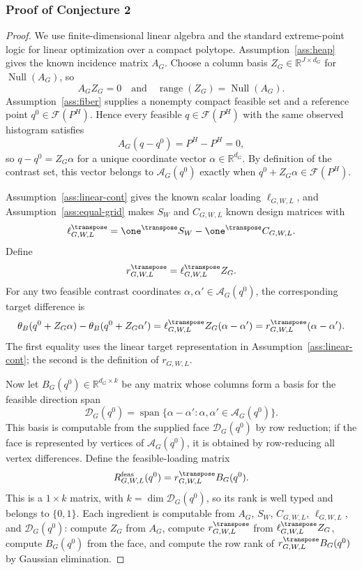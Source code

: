 \subsubsection*{Proof of Conjecture 2}
\begin{proof}
We use finite-dimensional linear algebra and the standard extreme-point logic for linear optimization over a compact polytope.  Assumption~\ref{ass:heap} gives the known incidence matrix \(A_G\).  Choose a column basis \(Z_G\in\mathbb{R}^{J\times d_G}\) for \(\operatorname{Null}(A_G)\), so
\[
A_GZ_G=0
\quad\text{and}\quad
\operatorname{range}(Z_G)=\operatorname{Null}(A_G).
\]
Assumption~\ref{ass:fiber} supplies a nonempty compact feasible set and a reference point \(q^0\in\mathcal{F}(P^H)\).  Hence every feasible \(q\in\mathcal{F}(P^H)\) with the same observed histogram satisfies
\[
A_G(q-q^0)=P^H-P^H=0,
\]
so \(q-q^0=Z_G\alpha\) for a unique coordinate vector \(\alpha\in\mathbb{R}^{d_G}\).  By definition of the contrast set, this vector belongs to \(\mathcal{A}_G(q^0)\) exactly when \(q^0+Z_G\alpha\in\mathcal{F}(P^H)\).

Assumption~\ref{ass:linear-cont} gives the known scalar loading \(\ell_{G,W,L}\), and Assumption~\ref{ass:equal-grid} makes \(S_W\) and \(C_{G,W,L}\) known design matrices with
\[
\ell_{G,W,L}^{\transpose}=\one^{\transpose}S_W-\one^{\transpose}C_{G,W,L}.
\]
Define
\[
r_{G,W,L}^{\transpose}=\ell_{G,W,L}^{\transpose}Z_G .
\]
For any two feasible contrast coordinates \(\alpha,\alpha'\in\mathcal{A}_G(q^0)\), the corresponding target difference is
\[
\theta_B(q^0+Z_G\alpha)-\theta_B(q^0+Z_G\alpha')
=\ell_{G,W,L}^{\transpose}Z_G(\alpha-\alpha')
=r_{G,W,L}^{\transpose}(\alpha-\alpha').
\]
The first equality uses the linear target representation in Assumption~\ref{ass:linear-cont}; the second is the definition of \(r_{G,W,L}\).

Now let \(B_G(q^0)\in\mathbb{R}^{d_G\times k}\) be any matrix whose columns form a basis for the feasible direction span
\[
\mathcal{D}_G(q^0)=\operatorname{span}\{\alpha-\alpha':\alpha,\alpha'\in\mathcal{A}_G(q^0)\}.
\]
This basis is computable from the supplied face \(\mathcal{D}_G(q^0)\) by row reduction; if the face is represented by vertices of \(\mathcal{A}_G(q^0)\), it is obtained by row-reducing all vertex differences.  Define the feasible-loading matrix
\[
R^{\mathrm{feas}}_{G,W,L}(q^0)=r_{G,W,L}^{\transpose}B_G(q^0).
\]
This is a \(1\times k\) matrix, with \(k=\dim\mathcal{D}_G(q^0)\), so its rank is well typed and belongs to \(\{0,1\}\).  Each ingredient is computable from \(A_G\), \(S_W\), \(C_{G,W,L}\), \(\ell_{G,W,L}\), and \(\mathcal{D}_G(q^0)\): compute \(Z_G\) from \(A_G\), compute \(r_{G,W,L}^{\transpose}\) from \(\ell_{G,W,L}^{\transpose}Z_G\), compute \(B_G(q^0)\) from the face, and compute the row rank of \(r_{G,W,L}^{\transpose}B_G(q^0)\) by Gaussian elimination.


\end{proof}
